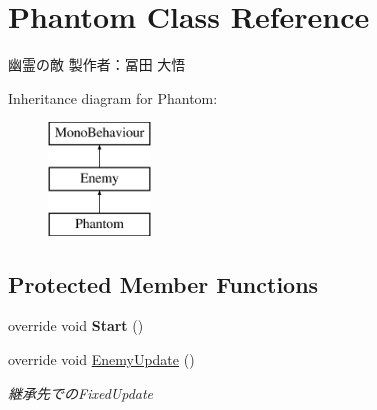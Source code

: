 \hypertarget{class_phantom}{}\section{Phantom Class Reference}
\label{class_phantom}


幽霊の敵 製作者：冨田 大悟  


Inheritance diagram for Phantom\+:\begin{figure}[H]
\begin{center}
\leavevmode
\includegraphics[height=3.000000cm]{class_phantom}
\end{center}
\end{figure}
\subsection*{Protected Member Functions}
\begin{DoxyCompactItemize}
\item 
\mbox{\label{class_phantom_a38f18199e11846d09c21a8742864139b}} 
override void {\bfseries Start} ()
\item 
override void \hyperlink{class_phantom_ab639a11fe75cb4bce641d5bd52601fae}{Enemy\+Update} ()
\begin{DoxyCompactList}\small\item\em 継承先での\+Fixed\+Update \end{DoxyCompactList}\end{DoxyCompactItemize}
